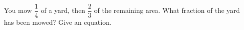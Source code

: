 You mow $\dfrac{1}{4}$ of a yard, then $\dfrac{2}{3}$ of the remaining area. What fraction of the yard has been mowed? Give an equation.
